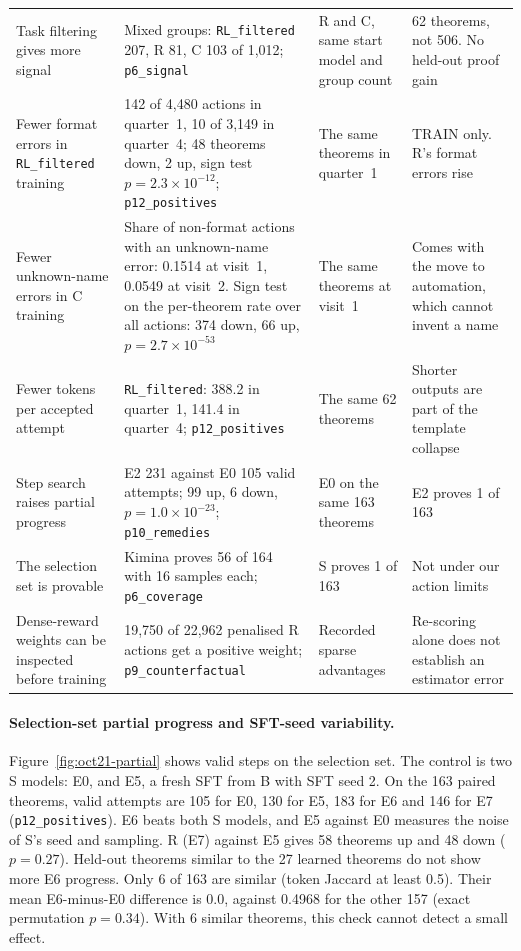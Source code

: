 \documentclass[11pt]{article}
\newcommand{\code}[1]{\texttt{#1}}
\newcommand{\pth}[1]{\nolinkurl{#1}}
\begin{document}
\begin{table}[!htbp]
\begin{tabularx}{\textwidth}{@{}P{3.0cm}P{5.6cm}P{2.6cm}Y@{}}
Task filtering gives more signal & Mixed groups: \code{RL\_filtered} 207, R 81, C 103 of 1,012; \pth{p6_signal} & R and C, same start model and group count & 62 theorems, not 506. No held-out proof gain \\
Fewer format errors in \code{RL\_filtered} training & 142 of 4,480 actions in quarter~1, 10 of 3,149 in quarter~4; 48 theorems down, 2 up, sign test $p = 2.3 \times 10^{-12}$; \pth{p12_positives} & The same theorems in quarter~1 & TRAIN only. R's format errors rise \\
Fewer unknown-name errors in C training & Share of non-format actions with an unknown-name error: 0.1514 at visit~1, 0.0549 at visit~2. Sign test on the per-theorem rate over all actions: 374 down, 66 up, $p = 2.7 \times 10^{-53}$ & The same theorems at visit~1 & Comes with the move to automation, which cannot invent a name \\
Fewer tokens per accepted attempt & \code{RL\_filtered}: 388.2 in quarter~1, 141.4 in quarter~4; \pth{p12_positives} & The same 62 theorems & Shorter outputs are part of the template collapse \\
Step search raises partial progress & E2 231 against E0 105 valid attempts; 99 up, 6 down, $p = 1.0 \times 10^{-23}$; \pth{p10_remedies} & E0 on the same 163 theorems & E2 proves 1 of 163 \\
The selection set is provable & Kimina proves 56 of 164 with 16 samples each; \pth{p6_coverage} & S proves 1 of 163 & Not under our action limits \\
Dense-reward weights can be inspected before training & 19,750 of 22,962 penalised R actions get a positive weight; \pth{p9_counterfactual} & Recorded sparse advantages & Re-scoring alone does not establish an estimator error \\
\bottomrule
\end{tabularx}
\end{table}

\paragraph{Selection-set partial progress and SFT-seed variability.}
Figure~\ref{fig:oct21-partial} shows valid steps on the selection set.
The control is two S models: E0, and E5, a fresh SFT from B with SFT seed 2.
On the 163 paired theorems, valid attempts are 105 for E0, 130 for E5, 183 for E6 and 146 for E7 (\pth{p12_positives}).
E6 beats both S models, and E5 against E0 measures the noise of S's seed and sampling.
R (E7) against E5 gives 58 theorems up and 48 down ($p = 0.27$).
Held-out theorems similar to the 27 learned theorems do not show more E6 progress.
Only 6 of 163 are similar (token Jaccard at least 0.5). Their mean E6-minus-E0 difference is 0.0, against 0.4968 for the other 157 (exact permutation $p = 0.34$).
With 6 similar theorems, this check cannot detect a small effect.
\end{document}
